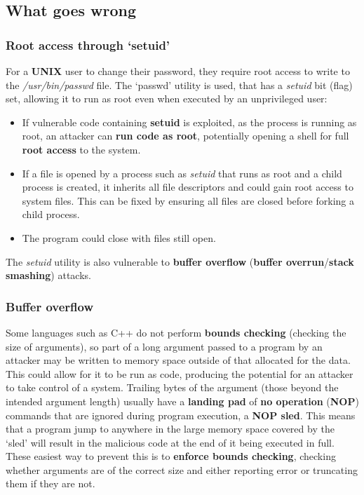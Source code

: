 \documentclass[final]{article}
\begin{document}
\pagebreak

\subsection{What goes wrong}

\subsubsection{Root access through `setuid'}
For a \textbf{UNIX} user to change their password, they require root access to write to the \textit{/usr/bin/passwd} file. The `passwd' utility is used, that has a \textit{setuid} bit (flag) set, allowing it to run as root even when executed by an unprivileged user:
\begin{itemize}
	\item If vulnerable code containing \textbf{setuid} is exploited, as the process is running as root, an attacker can \textbf{run code as root}, potentially opening a shell for full \textbf{root access} to the system.
	\item If a file is opened by a process such as \textit{setuid} that runs as root and a child process is created, it inherits all file descriptors and could gain root access to system files. This can be fixed by ensuring all files are closed before forking a child process.
	\item The program could close with files still open. 
\end{itemize}
The \textit{setuid} utility is also vulnerable to \textbf{buffer overflow} (\textbf{buffer overrun}/\textbf{stack smashing}) attacks.

\subsubsection{Buffer overflow}
Some languages such as C++ do not perform \textbf{bounds checking} (checking the size of arguments), so part of a long argument passed to a program by an attacker may be written to memory space outside of that allocated for the data. This could allow for it to be run as code, producing the potential for an attacker to take control of a system. Trailing bytes of the argument (those beyond the intended argument length) usually have a \textbf{landing pad} of \textbf{no operation} (\textbf{NOP}) commands that are ignored during program execution, a \textbf{NOP sled}. This means that a program jump to anywhere in the large memory space covered by the `sled' will result in the malicious code at the end of it being executed in full. These easiest way to prevent this is to \textbf{enforce bounds checking}, checking whether arguments are of the correct size and either reporting error or truncating them if they are not.
\end{document}
